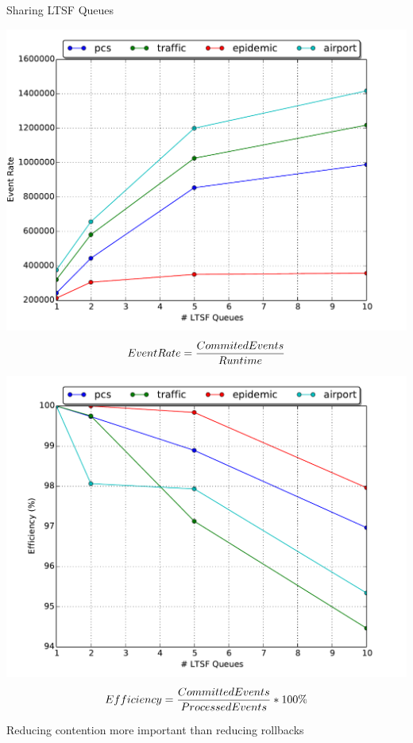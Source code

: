 \documentclass[10pt]{beamer}
\begin{document}
\begin{frame}{Sharing LTSF Queues}
    \begin{minipage}{0.5\textwidth}
        \includegraphics[width=\textwidth]{../figs/pending_event_set/ltsf_event_rate.pdf}
        $$EventRate={CommitedEvents \over Runtime}$$
    \end{minipage}%
    \begin{minipage}{0.5\textwidth}
        \includegraphics[width=\textwidth]{../figs/pending_event_set/ltsf_efficiency.pdf}
        $$Efficiency={CommittedEvents \over ProcessedEvents}*100 \%$$
    \end{minipage}
    \begin{block}{Reducing contention more important than reducing rollbacks}\end{block}
\end{frame}
\end{document}
